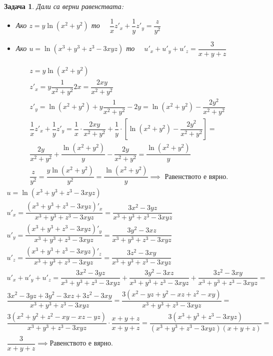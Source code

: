 \documentclass[a4paper,fleqn,12pt]{article}
\newtheorem{task}{Задача}[section]
\begin{document}
\begin{task}
Дали са верни равенствата: \\
\begin{itemize}
\item Ако $z = y\ln{(x^2+y^2)}$ то $\quad \dfrac{1}{x} z'_x + \dfrac{1}{y} z'_y = \dfrac{z}{y^2}$
\item Ако $u = \ln{(x^3+y^3 + z^3 - 3xyz)} $ то $ \quad u'_x + u'_y + u'_z = \dfrac{3}{x+y+z}$
\end{itemize}
\begin{gather*}
z = y\ln{(x^2+y^2)} \\
z'_x = y\dfrac{1}{x^2 + y^2} 2x = \dfrac{2xy}{x^2 + y^2}\\
z'_y = \ln{(x^2+y^2)} + y\dfrac{1}{x^2 + y^2} -2y = \ln{(x^2+y^2)} - \dfrac{2y^2}{x^2 + y^2}\\ 
\dfrac{1}{x} z'_x + \dfrac{1}{y} z'_y = \dfrac{1}{x} \cdot \dfrac{2xy}{x^2 + y^2}  + \dfrac{1}{y} \cdot \left[\ln{(x^2+y^2)} - \dfrac{2y^2}{x^2 + y^2}\right] =\\
\dfrac{2y}{x^2 + y^2} + \dfrac{\ln{(x^2+y^2)}}{y} - \dfrac{2y}{x^2 + y^2} =   \dfrac{\ln{(x^2+y^2)}}{y} \\
\dfrac{z}{y^2} = \dfrac{y\ln{(x^2+y^2)}}{y^2} = \dfrac{\ln{(x^2+y^2)}}{y} \implies \text{ Равенството е вярно. }
\end{gather*}
\begin{gather*}
u = \ln{(x^3+y^3 + z^3 - 3xyz)} \\
u'_x = \dfrac{(x^3+y^3 + z^3 - 3xyz)'_x}{x^3+y^3 + z^3 - 3xyz} =  \dfrac{3x^2 - 3yz}{x^3+y^3 + z^3 - 3xyz}\\
u'_y = \dfrac{(x^3+y^3 + z^3 - 3xyz)'_y}{x^3+y^3 + z^3 - 3xyz} =  \dfrac{3y^2 - 3xz}{x^3+y^3 + z^3 - 3xyz}\\
u'_z = \dfrac{(x^3+y^3 + z^3 - 3xyz)'_z}{x^3+y^3 + z^3 - 3xyz} =  \dfrac{3z^2 - 3xy}{x^3+y^3 + z^3 - 3xyz}\\
u'_x + u'_y + u'_z  = \dfrac{3x^2 - 3yz}{x^3+y^3 + z^3 - 3xyz} + \dfrac{3y^2 - 3xz}{x^3+y^3 + z^3 - 3xyz} + \dfrac{3z^2 - 3xy}{x^3+y^3 + z^3 - 3xyz} =\\
\dfrac{3x^2 - 3yz + 3y^2 - 3xz + 3z^2 - 3xy}{x^3+y^3 + z^3 - 3xyz} = \dfrac{3(x^2 - yz + y^2 - xz + z^2 - xy)}{x^3+y^3 + z^3 - 3xyz} =\\
\dfrac{3(x^2 + y^2 + z^2 -xy -xz -yz)}{x^3+y^3 + z^3 - 3xyz} \cdot \dfrac{x+y+z}{x+y+z} = \dfrac{3(x^3+y^3 + z^3 - 3xyz)}{(x^3+y^3 + z^3 - 3xyz)(x+y+z)} =\\
\dfrac{3}{x+y+z} \implies \text{Равенството е вярно.}
\end{gather*}
\end{task}
\end{document}
